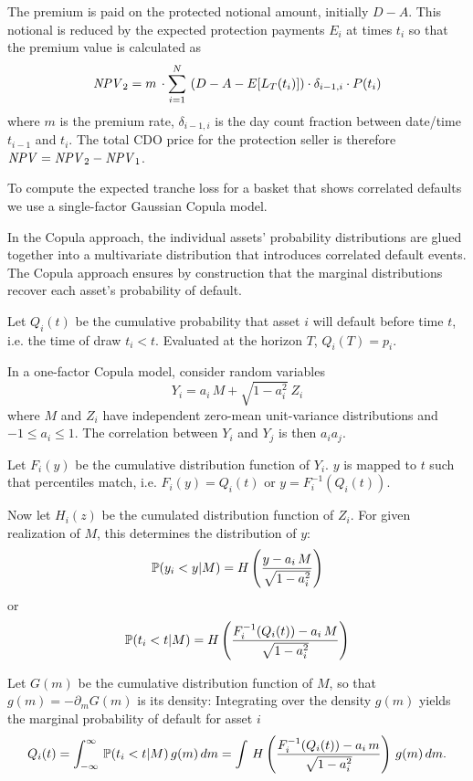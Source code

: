 The premium is paid on the protected notional amount, initially
$D-A$.  This notional is reduced by the expected protection payments 
$E_i$ at times $t_i$ so that the premium value is calculated as
$$ 
\NPV_2 = m \, \cdot \sum_{i=1}^N \,\left(D - A - E[L_T(t_i)]\right) 
	\cdot \delta_{i-1,i} \cdot P(t_i)
$$
where $m$ is the premium rate, $\delta_{i-1, i}$ is the day count
fraction between date/time $t_{i-1}$ and $t_i.$
The total CDO price for the protection seller is therefore
$\NPV=\NPV_2 - \NPV_1$. 

\bigskip
To compute the expected tranche loss for a basket that shows 
correlated defaults we use a single-factor Gaussian 
Copula model.

In the Copula approach, the individual assets' probability
distributions are glued together into a multivariate distribution that
introduces correlated default events. The Copula approach ensures by
construction that the marginal distributions recover each asset's
probability of default.

\medskip

Let $Q_i(t)$ be the cumulative probability that asset $i$ will default
before time $t$, i.e. the time of draw $t_i<t$. Evaluated at the
horizon $T$, $Q_i(T)=p_i$.

In a one-factor Copula model, consider random variables 
$$
 Y_i = a_i\,M+\sqrt{1-a_i^2}\:Z_i \label{y} 
$$
where $M$ and $Z_i$ have independent zero-mean unit-variance
distributions and $-1\leq a_i \leq 1$. The correlation between 
$Y_i$ and $Y_j$ is then $a_i a_j$.

Let $F_i(y)$ be the cumulative distribution function of $Y_i$. 
$y$ is mapped to $t$ such that percentiles match, i.e. 
$F_i(y)=Q_i(t)$ or $y=F_i^{-1}(Q_i(t))$.

Now let $H_i(z)$ be the cumulated distribution function of $Z_i$. 
For given realization of $M$, this determines the distribution of $y$:
$$ 
\P (y_i < y|M) = H \left( \frac{y-a_i\,M}{\sqrt{1-a_i^2}}\right) 
$$
or
$$
\P (t_i < t|M) = H \left( \frac{F_i^{-1}(Q_i(t))-a_i\,M}{\sqrt{1-a_i^2}}\right) 
$$

Let $G(m)$ be the cumulative distribution function of $M$, so that 
$g(m) = -\partial_m G(m)$ is its density: Integrating
over the density $g(m)$ yields the marginal probability of default for
 asset $i$
$$ 
Q_i(t) = \int_{-\infty}^\infty\, \P(t_i < t|M)\,g(m)\,dm 
= \int\, H \left( \frac{F_i^{-1}(Q_i(t))-a_i\,m}{\sqrt{1-a_i^2}}\right) \,g(m)\,dm.
$$

